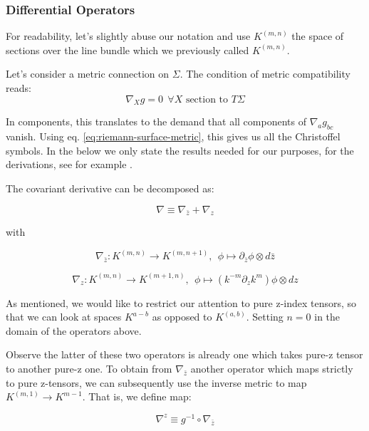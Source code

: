 \subsubsection{Differential Operators}

    For readability, let's slightly abuse our notation and use $K^{(m, n)}$ the space of sections over the line bundle which we previously called $K^{(m, n)}$.

    Let's consider a metric connection on $\Sigma$. The condition of metric compatibility reads:
    \begin{equation}
        \nabla_X g = 0 ~~ \forall X \text{ section to $T\Sigma$}
    \end{equation}

    In components, this translates to the demand that all components of $\nabla_a g_{bc}$ vanish. Using eq. \ref{eq:riemann-surface-metric}, this gives us all the Christoffel symbols. In the below we only state the results needed for our purposes, for the derivations, see for example \cite{nakahara}.

    The covariant derivative can be decomposed as:

    \begin{equation}
        \nabla \equiv \nabla_{\bar z} + \nabla_{ z}
    \end{equation}

    with

    \begin{equation}
        \nabla_{\bar z}: K^{(m, n)} \to K^{(m, n+1)}, ~~ \phi \mapsto \partial_{\bar z} \phi \otimes d \bar z
    \end{equation}

    \begin{equation}
        \nabla_z: K^{(m, n)} \to K^{(m + 1, n)}, ~~ \phi \mapsto (k^{-m} \partial_z k^m) \phi \otimes d z
    \end{equation}

    As mentioned, we would like to restrict our attention to pure z-index tensors, so that we can look at spaces $K^{a-b}$ as opposed to $K^{(a, b)}$. Setting $n=0$ in the domain of the operators above.

    Observe the latter of these two operators is already one which takes pure-z tensor to another pure-z one. To obtain from $\nabla_{\bar z}$ another operator which maps strictly to pure z-tensors, we can subsequently use the inverse metric to map $K^{(m, 1)} \to K^{m-1}$. That is, we define map:

    \begin{equation}
        \nabla^z \equiv g^{-1} \circ \nabla_{\bar z}
    \end{equation}

